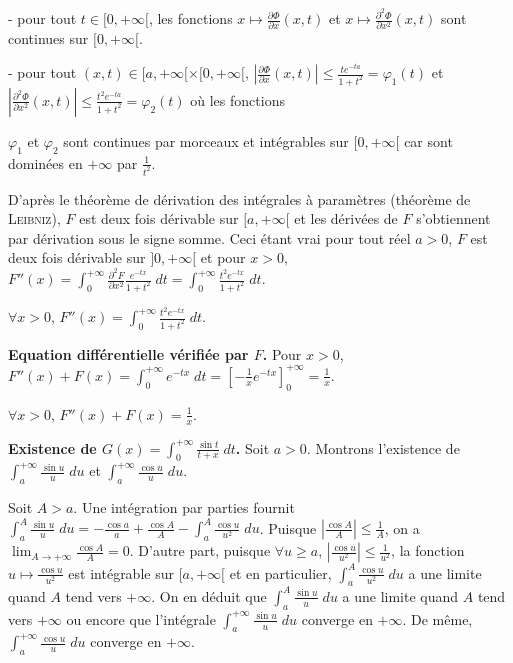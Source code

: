 {{- pour tout $t\in[0,+\infty[$, les fonctions $x\mapsto \frac{\partial \Phi}{\partial x}(x,t)$ et $x\mapsto \frac{\partial^2\Phi}{\partial x^2}(x,t)$ sont continues sur $[0,+\infty[$.

- pour tout $(x,t)\in[a,+\infty[\times[0,+\infty[$, $\left| \frac{\partial \Phi}{\partial x}(x,t)\right|\leqslant \frac{te^{-ta}}{1+t^2}=\varphi_1(t)$ et  $\left| \frac{\partial^2\Phi}{\partial x^2}(x,t)\right|\leqslant \frac{t^2e^{-ta}}{1+t^2}=\varphi_2(t)$ où les fonctions 

$\varphi_1$ et $\varphi_2$ sont continues par morceaux et intégrables sur $[0,+\infty[$ car sont dominées en $+\infty$ par $ \frac{1}{t^2}$.
 
 
 

 
 
D'après le théorème de dérivation des intégrales à paramètres (théorème de \textsc{Leibniz}), $F$ est deux fois dérivable sur $[a,+\infty[$ et les dérivées de $F$ s'obtiennent par dérivation sous le signe somme. Ceci étant vrai pour tout réel $a>0$, $F$ est deux fois dérivable sur $]0,+\infty[$ et pour $x>0$, $F''(x)=\int_{0}^{+\infty} \frac{\partial^2F}{\partial x^2} \frac{e^{-tx}}{1+t^2}\;dt=\int_{0}^{+\infty} \frac{t^2e^{-tx}}{1+t^2}\;dt$.

\begin{center}
$\forall x>0$, $F''(x)=\int_{0}^{+\infty} \frac{t^2e^{-tx}}{1+t^2}\;dt$.
\end{center}

\textbf{Equation différentielle vérifiée par $F$.} Pour $x>0$, $F''(x)+F(x)=\int_{0}^{+\infty}e^{-tx}\;dt=\left[- \frac{1}{x}e^{-tx}\right]_0^{+\infty}= \frac{1}{x}$.

\begin{center}
$\forall x>0$, $F''(x)+F(x)= \frac{1}{x}$.
\end{center}

\textbf{Existence de $G(x)=\int_{0}^{+\infty} \frac{\sin t}{t+x}\;dt$.} Soit $a>0$. Montrons l'existence de $\int_{a}^{+\infty} \frac{\sin u}{u}\;du$ et $\int_{a}^{+\infty} \frac{\cos u}{u}\;du$.

Soit $A>a$. Une intégration par parties fournit $\int_{a}^{A} \frac{\sin u}{u}\;du=- \frac{\cos a}{a}+ \frac{\cos A}{A}-\int_{a}^{A} \frac{\cos u}{u^2}\;du$. Puisque $\left| \frac{\cos A}{A}\right|\leqslant \frac{1}{A}$, on a $\lim_{A \rightarrow +\infty} \frac{\cos A}{A}=0$. D'autre part, puisque $\forall u\geqslant a$, $\left| \frac{\cos u}{u^2}\right|\leqslant \frac{1}{u^2}$, la fonction $u\mapsto \frac{\cos u}{u^2}$ est intégrable sur $[a,+\infty[$ et en particulier, $\int_{a}^{A} \frac{\cos u}{u^2}\;du$ a une limite quand $A$ tend vers $+\infty$. On en déduit que $\int_{a}^{A} \frac{\sin u}{u}\;du$ a une limite quand $A$ tend vers $+\infty$ ou encore que l'intégrale $\int_{a}^{+\infty} \frac{\sin u}{u}\;du$ converge en $+\infty$. De même, $\int_{a}^{+\infty} \frac{\cos u}{u}\;du$ converge en $+\infty$. 

}}
